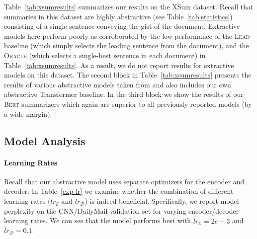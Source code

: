 \documentclass[11pt,a4paper]{article}
\makeatletter
\newcommand{\thickhline}{\noalign {\ifnum 0=`}\fi \hrule height 1pt
    \futurelet \reserved@a \@xhline
}
\makeatother
\begin{document}
    
    Table~\ref{tab:xsumresults} summarizes our results on the XSum
    dataset. Recall that summaries in this dataset are highly
    abstractive (see Table~\ref{tab:statistics}) consisting of a
    single sentence conveying the gist of the document. Extractive
    models here perform poorly as corroborated by the low performance
    of the \textsc{Lead} baseline (which simply selects the leading
    sentence from the document), and the \textsc{Oracle} (which
    selects a single-best sentence in each document) in
    Table~\ref{tab:xsumresults}. As a result, we do not report results
    for extractive models on this dataset.
    The second block in Table~\ref{tab:xsumresults} presents the results
    of various abstractive models taken from \citet{xsum} and also
    includes our own abstractive Transformer baseline. In the third block
    we show the results of our \textsc{Bert} summarizers which again are
    superior to all previously reported models (by a wide margin).
    
    \begin{table}[t]
        \caption{\label{exp-lr} Model perplexity  (CNN/DailyMail; validation set)
            under different combinations of encoder  and decoder
            learning rates.}
    \end{table}
    
    
    \subsection{Model Analysis}
    
    \paragraph{Learning Rates} Recall that our abstractive model uses
    separate optimizers for the encoder and decoder. In Table~\ref{exp-lr}
    we examine whether the combination of different learning rates
    ($\tilde{lr}_{\mathcal{E}}$ and $\tilde{lr}_{\mathcal{D}}$) is indeed
    beneficial.  Specifically, we report model perplexity on the
    CNN/DailyMail validation set for varying encoder/decoder learning
    rates.  We can see that the model performs best with
    $\tilde{lr}_{\mathcal{E}}=2e-3$ and $\tilde{lr}_{\mathcal{D}}=0.1$.
    
\end{document}
